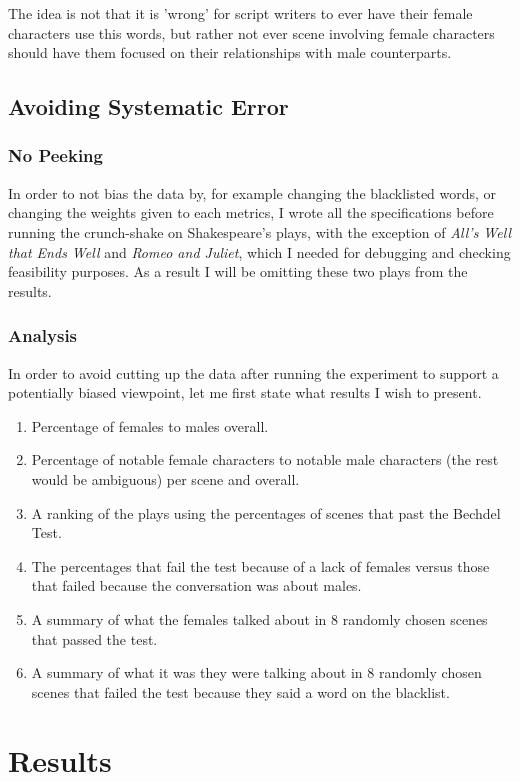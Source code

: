 \documentclass[12pt]{article}
\begin{document}
The idea is not that it is 'wrong' for script writers to ever have their female
characters use this words, but rather not ever scene involving female
characters should have them focused on their relationships with male
counterparts.

\subsection{Avoiding Systematic Error}
\label{sub:Precautions}

\subsubsection{No Peeking}

In order to not bias the data by, for example changing the blacklisted words,
or changing the weights given to each metrics, I wrote all the specifications
before running the crunch-shake on Shakespeare's plays, with the exception of
\emph{All's Well that Ends Well} and \emph{Romeo and Juliet}, which I needed
for debugging and checking feasibility purposes. As a result I will be omitting
these two plays from the results. 

\subsubsection{Analysis}

In order to avoid cutting up the data after running the experiment to support a
potentially biased viewpoint, let me first state what results I wish to present.

\begin{enumerate}
    \item Percentage of females to males overall.
    \item Percentage of notable female characters to notable male characters
        (the rest would be ambiguous) per scene and overall.
    \item A ranking of the plays using the percentages of scenes that past the
        Bechdel Test.
    \item The percentages that fail the test because of a lack of females versus
        those that failed because the conversation was about males.
    \item A summary of what the females talked about in 8 randomly chosen
        scenes that passed the test. 
    \item A summary of what it was they were talking about in 8 randomly chosen
        scenes that failed the test because they said a word on the blacklist.
\end{enumerate}


\section{Results}
\label{sec:results}

 
 
\end{document}
